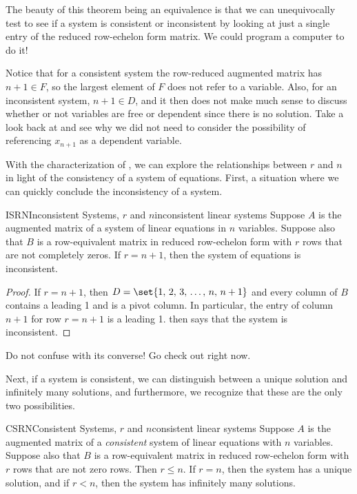 %
The beauty of this theorem being an equivalence is that we can unequivocally test to see if a system is consistent or inconsistent by looking at just a single entry of the reduced row-echelon form matrix.  We could program a computer to do it!\par
%
%
Notice that for a consistent system the row-reduced augmented matrix has $n+1\in F$, so the largest element of $F$ does not refer to a variable.  Also, for an inconsistent system, $n+1\in D$, and it then does not make much sense to discuss whether or not variables are free or dependent since there is no solution.  Take a look back at  and see why we did not need to consider the possibility of referencing $x_{n+1}$ as a dependent variable.\par
%
With the characterization of , we can explore the relationships between $r$ and $n$ in light of the consistency of a system of equations.  First, a situation where we can quickly conclude the inconsistency of a system.
%
\begin{theorem}{ISRN}{Inconsistent Systems, $r$ and $n$}{inconsistent linear systems}
Suppose $A$ is the augmented matrix of a system of linear equations in $n$ variables.  Suppose also that $B$ is a row-equivalent matrix in reduced row-echelon form with $r$ rows that are not completely zeros.  If $r=n+1$, then the system of equations is inconsistent.
\end{theorem}
%
\begin{proof}
If  $r=n+1$, then $D=\set{1,\,2,\,3,\,\ldots,\,n,\,n+1}$ and every column of $B$ contains a leading 1 and is a pivot column.  In particular, the entry of column $n+1$ for row $r=n+1$ is a leading 1.   then says that the system is inconsistent.
\end{proof}
%
{Do not confuse  with its converse!}
{Go check out  right now.}
\par
%
Next, if a system is consistent, we can distinguish between a unique solution and infinitely many solutions, and furthermore, we recognize that these are the only two possibilities.
%
\begin{theorem}{CSRN}{Consistent Systems, $r$ and $n$}{consistent linear systems}
Suppose $A$ is the augmented matrix of a {\em consistent} system of linear equations with $n$ variables.  Suppose also that $B$ is a row-equivalent matrix in reduced row-echelon form with $r$ rows that are not zero rows.  Then $r\leq n$.  If $r=n$, then the system has a unique solution, and if $r<n$, then the system has infinitely many solutions.
\end{theorem}
